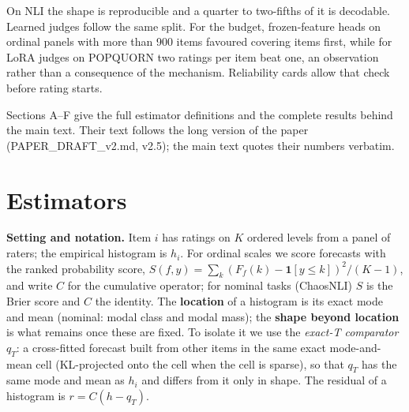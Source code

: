 \documentclass[10pt,twocolumn]{article}
\begin{document}
On NLI the shape is reproducible and a quarter to two-fifths of it is decodable. Learned judges follow the same split. For the budget, frozen-feature heads on ordinal panels with more than 900 items favoured covering items first, while for LoRA judges on POPQUORN two ratings per item beat one, an observation rather than a consequence of the mechanism. Reliability cards allow that check before rating starts.



\onecolumn
\appendix

Sections A--F give the full estimator definitions and the complete results behind the main text. Their text follows the long version of the paper (PAPER\_DRAFT\_v2.md, v2.5); the main text quotes their numbers verbatim.

\section{Estimators}

\textbf{Setting and notation.} Item \(i\) has ratings on \(K\) ordered levels from a panel of raters; the empirical histogram is \(h_i\). For ordinal scales we score forecasts with the ranked probability score, \(S(f,y)=\sum_k (F_f(k)-\mathbf 1[y\le k])^2/(K-1)\), and write \(C\) for the cumulative operator; for nominal tasks (ChaosNLI) \(S\) is the Brier score and \(C\) the identity. The \textbf{location} of a histogram is its exact mode and mean (nominal: modal class and modal mass); the \textbf{shape beyond location} is what remains once these are fixed. To isolate it we use the \emph{exact-T comparator} \(q_T\): a cross-fitted forecast built from other items in the same exact mode-and-mean cell (KL-projected onto the cell when the cell is sparse), so that \(q_T\) has the same mode and mean as \(h_i\) and differs from it only in shape. The residual of a histogram is \(r = C(h - q_T)\).
\end{document}
